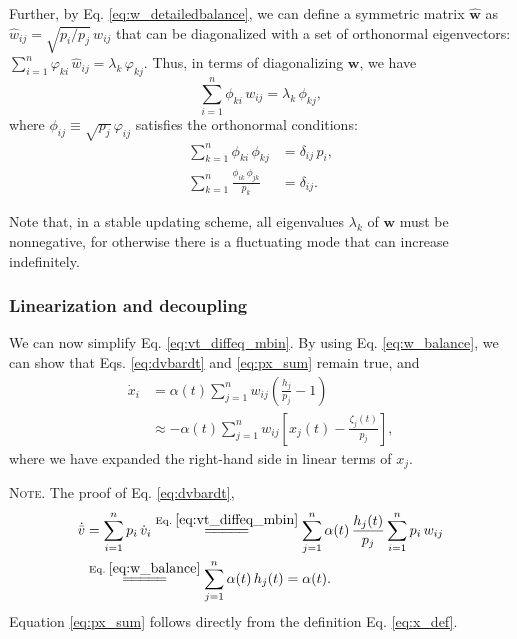 \documentclass[reprint]{revtex4-1}
\newcommand{\note}[1]{{\color{DarkGreen}\footnotesize \textsc{Note.} #1}}
\begin{document}
Further, by Eq. \eqref{eq:w_detailedbalance},
we can define a symmetric matrix $\hat{\mathbf w}$
as $\hat w_{ij} = \sqrt{p_i/p_j} \, w_{ij}$
that can be diagonalized\cite{vankampen}
with a set of orthonormal eigenvectors:
%
$\sum_{i = 1}^n \varphi_{ki} \, \hat w_{ij} = \lambda_k \, \varphi_{kj}$.
%
Thus,
in terms of diagonalizing $\mathbf w$, we have
\begin{equation}
  \sum_{i = 1}^n \phi_{ki} \, w_{ij} = \lambda_k \, \phi_{kj},
  \label{eq:eig_w}
\end{equation}
where
$\phi_{ij} \equiv \sqrt{p_j} \, \varphi_{ij}$ satisfies
the orthonormal conditions\cite{vankampen}:
%
\begin{align}
\sum_{k = 1}^n \phi_{ki} \, \phi_{kj}
&= \delta_{ij} \, p_i,
\label{eq:eig_orthonormal_cols}
\\
\sum_{k = 1}^n \frac{ \phi_{ik} \, \phi_{jk} }{ p_k }
&= \delta_{ij}.
\label{eq:eig_orthonormal_rows}
\end{align}



Note that, in a stable updating scheme,
all eigenvalues $\lambda_k$ of $\mathbf w$
must be nonnegative,
for otherwise there is a fluctuating mode
that can increase indefinitely.



\subsubsection{Linearization and decoupling}



We can now simplify Eq. \eqref{eq:vt_diffeq_mbin}.
%
By using Eq. \eqref{eq:w_balance},
we can show that
Eqs. \eqref{eq:dvbardt} and \eqref{eq:px_sum}
remain true, and
%
$$
\begin{aligned}
\dot x_i
&= \alpha(t) \sum_{j=1}^n w_{ij}
\left( \frac{ h_j } { p_j }  - 1 \right)
\\
&\approx
-\alpha(t) \sum_{j = 1}^n
w_{ij} \left[ x_j(t) - \frac{\zeta_j (t)}{p_j} \right],
\end{aligned}
$$
where
we have expanded the right-hand side
in linear terms of $x_j$.

\note{The proof of Eq. \eqref{eq:dvbardt},
$$
\begin{aligned}
  \dot{ \bar v }
  &= \sum_{i = 1}^n p_i \, \dot v_i
  \stackrel{\mathrm{Eq.\; \eqref{eq:vt_diffeq_mbin}}}
  {=\joinrel=\joinrel=\joinrel=\joinrel=}
  \sum_{j = 1}^n \alpha(t) \, \frac{ h_j(t) } { p_j } \sum_{ i = 1 }^{n} p_i \, w_{ij}
  \\
  &
  \stackrel{\mathrm{Eq.\; \eqref{eq:w_balance}}}
  {=\joinrel=\joinrel=\joinrel=\joinrel=}
  \sum_{j = 1}^n \alpha(t) \, h_j(t) = \alpha(t).
\end{aligned}
$$
Equation \eqref{eq:px_sum} follows directly from the definition
Eq. \eqref{eq:x_def}.
}
\end{document}
